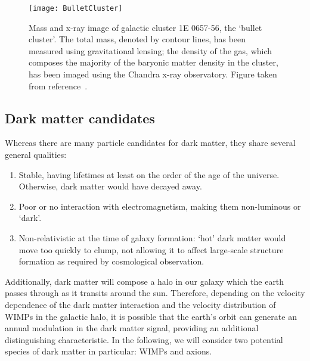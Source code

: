 			\begin{figure}
				\centering
				\texttt{[image: BulletCluster]}
				\caption[Mass and x-ray image of the `bullet cluster', galactic cluster 1E 0657-56.]{Mass and x-ray image of 
				galactic cluster 1E 0657-56, 
				the `bullet cluster'.   The total mass, denoted by contour lines, has been measured using gravitational lensing; 
				the density of the gas, which composes the majority of the baryonic matter density in the cluster, has been 
				imaged using the Chandra x-ray observatory.  %
				Figure taken from reference~\cite{Clowe06}.}
				\label{fig:DMBulletCluster}
			\end{figure}	
	
		\subsection{Dark matter candidates}
	
	Whereas there are many particle candidates for dark matter, they share several general qualities:

	
	
			\begin{enumerate}	
				\item Stable, having lifetimes at least on the order of the age of the universe.  Otherwise, dark matter would have
				decayed away.  
				\item Poor or no interaction with electromagnetism, making them non-luminous or `dark'.
				\item Non-relativistic at the time of galaxy formation: `hot' dark matter would move too quickly to clump, 
				not allowing it to affect large-scale structure formation as required by cosmological observation.  
			\end{enumerate}		

Additionally, dark matter will compose a halo in our galaxy which the earth passes through as it transits around the sun.  Therefore, depending on the velocity dependence of the dark matter interaction and the velocity distribution of WIMPs in the galactic halo, it is possible that the earth's orbit can generate an annual modulation in the dark matter signal, providing an additional distinguishing characteristic.  In the following, we will consider two potential species of dark matter in particular: WIMPs and axions. 
